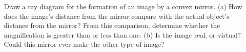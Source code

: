 Draw a ray
diagram for the formation of an image by a convex mirror.
(a) How does the image's distance
from the mirror compare with the actual object's distance
from the mirror? From this comparison, determine whether the
magnification is greater than or less than one. (b) Is the
image real, or virtual? Could this mirror ever make the
other type of image?

